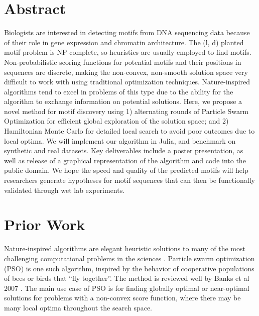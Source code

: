 \documentclass{article}
\begin{document}
\section{Abstract}
Biologists are interested in detecting motifs from DNA sequencing data because of their role in gene expression and chromatin architecture.
The (l, d) planted motif problem is NP-complete, so heuristics are usually employed to find motifs. Non-probabilistic scoring functions for potential motifs and their positions in sequences are discrete, making the non-convex, non-smooth solution space very difficult to work with using traditional optimization techniques. Nature-inspired algorithms tend to excel in problems of this type due to the ability for the algorithm to exchange information on potential solutions. Here, we propose a novel method for motif discovery using 1) alternating rounds of Particle Swarm Optimization for efficient global exploration of the solution space; and 2) Hamiltonian Monte Carlo for detailed local search to avoid poor outcomes due to local optima. We will implement our algorithm in Julia, and benchmark on synthetic and real datasets. Key deliverables include a poster presentation, as well as release of a graphical representation of the algorithm and code into the public domain. We hope the speed and quality of the predicted motifs will help researchers generate hypotheses for motif sequences that can then be functionally validated through wet lab experiments.
\section{Prior Work}
Nature-inspired algorithms are elegant heuristic solutions to many of the most challenging computational problems in the sciences \cite{fister2013brief}. Particle swarm optimization (PSO) is one such algorithm, inspired by the behavior of cooperative populations of bees or birds that ``fly together''. The method is reviewed well by Banks et al 2007 \cite{banks2007review}. The main use case of PSO is for finding globally optimal or near-optimal solutions for problems with a non-convex score function, where there may be many local optima throughout the search space.  
  
\end{document}
